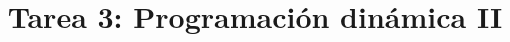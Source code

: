 \documentclass{doc}
\title{Tarea 3: Programación dinámica II}
\begin{document}
\makedocheader

\end{document}

